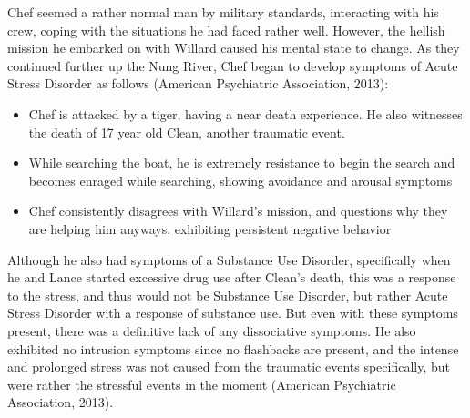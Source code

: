 \documentclass[a4paper,man,natbib]{apa6}
\begin{document}
Chef seemed a rather normal man by military standards, interacting with his crew, coping with the situations he had faced rather well. However, the hellish mission he embarked on with Willard caused his mental state to change. As they continued further up the Nung River, Chef began to develop symptoms of Acute Stress Disorder as follows (American Psychiatric Association, 2013):
\begin{itemize}
\item Chef is attacked by a tiger, having a near death experience. He also witnesses the death of 17 year old Clean, another traumatic event.
\item While searching the boat, he is extremely resistance to begin the search and becomes enraged while searching, showing avoidance and arousal symptoms
\item Chef consistently disagrees with Willard's mission, and questions why they are helping him anyways, exhibiting persistent negative behavior
\end{itemize}
Although he also had symptoms of a Substance Use Disorder, specifically when he and Lance started excessive drug use after Clean's death, this was a response to the stress, and thus would not be Substance Use Disorder, but rather Acute Stress Disorder with a response of substance use. But even with these symptoms present, there was a definitive lack of any dissociative symptoms. He also exhibited no intrusion symptoms since no flashbacks are present, and the intense and prolonged stress was not caused from the traumatic events specifically, but were rather the stressful events in the moment (American Psychiatric Association, 2013). 
\end{document}
